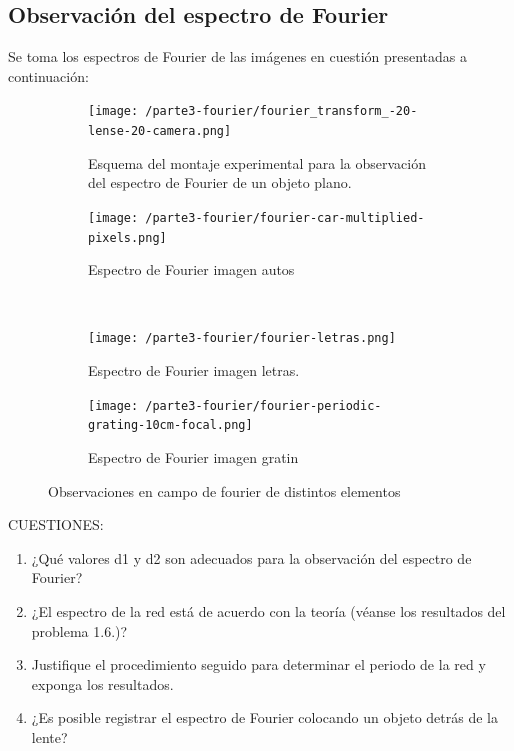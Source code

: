 \documentclass{./packages/optica-article}
\begin{document}
\subsection{Observación del espectro de Fourier}
Se toma los espectros de Fourier de las imágenes en cuestión presentadas a continuación:

\begin{figure}[hptb]
\begin{center}
    \begin{subfigure}[t]{0.45\textwidth}\centering
        \texttt{[image: /parte3-fourier/fourier\_transform\_-20-lense-20-camera.png]}
    \caption{Esquema del montaje experimental para la observación del espectro de Fourier de un objeto plano. }
    \label{fig:fourier1}
    \end{subfigure}
	\hfill
	\begin{subfigure}[t]{0.45\textwidth}\centering
		\texttt{[image: /parte3-fourier/fourier-car-multiplied-pixels.png]}
    \caption{Espectro de Fourier imagen autos }
    \label{fig:fourier2}
	\end{subfigure}
	\\
	\begin{subfigure}[t]{0.45\textwidth}\centering
		\texttt{[image: /parte3-fourier/fourier-letras.png]}
    \caption{Espectro de Fourier imagen letras. }
    \label{fourier3}
	\end{subfigure}
	\hfill
	\begin{subfigure}[t]{0.45\textwidth}\centering
		\texttt{[image: /parte3-fourier/fourier-periodic-grating-10cm-focal.png]}
    \caption{Espectro de Fourier imagen gratin }
    \label{fourier4}
	\end{subfigure}
	
	\caption{Observaciones en campo de fourier de distintos elementos
	}
	\label{fig:alltalbot}
\end{center}
\end{figure}

CUESTIONES:
\begin{enumerate}
    \item ¿Qué valores d1 y d2 son adecuados para la observación del espectro de Fourier?
    \item ¿El espectro de la red está de acuerdo con la teoría (véanse los resultados del problema 1.6.)?
    \item Justifique el procedimiento seguido para determinar el periodo de la red y exponga los resultados.
    \item ¿Es posible registrar el espectro de Fourier colocando un objeto detrás de la lente?
\end{enumerate}
\end{document}
